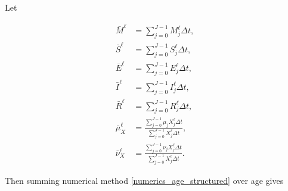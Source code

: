 \documentclass{jpmarticle}
\let\subequationsorig\subequations%
\let\endsubequationsorig\endsubequations%
\renewenvironment{subequations}{
  \subequationsorig
  \renewcommand{\theequation}{\theparentequation.\arabic{equation}}
}{
  \endsubequationsorig
}
\begin{document}
Let
\begin{subequations}
  \begin{align}
    \bar{M}^{\ell}
    &= \sum_{j = 0}^{J - 1} M_j^{\ell} \Delta t,
    \\
    \bar{S}^{\ell}
    &= \sum_{j = 0}^{J - 1} S_j^{\ell} \Delta t,
    \\
    \bar{E}^{\ell}
    &= \sum_{j = 0}^{J - 1} E_j^{\ell} \Delta t,
    \\
    \bar{I}^{\ell}
    &= \sum_{j = 0}^{J - 1} I_j^{\ell} \Delta t,
    \\
    \bar{R}^{\ell}
    &= \sum_{j = 0}^{J - 1} R_j^{\ell} \Delta t,
    \\
    \bar{\mu}_X^{\ell}
    &= \frac{\sum_{j = 0}^{J - 1} \mu_j X_j^{\ell} \Delta t}
      {\sum_{j = 0}^{J - 1} X_j^{\ell} \Delta t},
    \\
    \bar{\nu}_X^{\ell}
    &= \frac{\sum_{j = 0}^{J - 1} \nu_j X_j^{\ell} \Delta t}
    {\sum_{j = 0}^{J - 1} X_j^{\ell} \Delta t}.
  \end{align}
\end{subequations}
Then summing numerical method
\eqref{numerics_age_structured} over age gives
\end{document}

